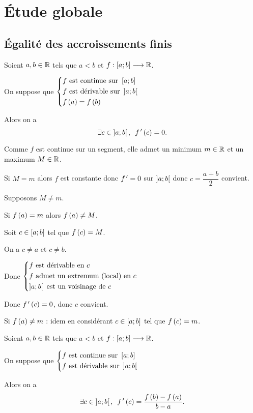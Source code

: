 \section{Étude globale}

\subsection{Égalité des accroissements finis}

\begin{theo}
Soient \(a,b\in\mathbb{R}\) tels que \(a<b\) et \(f:\left[a;b\right]\longrightarrow\mathbb{R}\).

On suppose que \(\begin{dcases}f\text{ est continue sur }\left[a;b\right] \\ f\text{ est dérivable sur }\left]a;b\right[ \\ f\left(a\right)=f\left(b\right)\end{dcases}\)

Alors on a \[\quantifs{\exists c\in\intervee{a}{b}}f\prim\paren{c}=0.\]
\end{theo}

\begin{dem}
Comme \(f\) est continue sur un segment, elle admet un minimum \(m\in\mathbb{R}\) et un maximum \(M\in\mathbb{R}\).

Si \(M=m\) alors \(f\) est constante donc \(f^{\,\prime}=0\) sur \(\left]a;b\right[\) donc \(c=\dfrac{a+b}{2}\) convient.

Supposons \(M\not=m\).

Si \(f\left(a\right)=m\) alors \(f\left(a\right)\not=M\).

Soit \(c\in\left[a;b\right]\) tel que \(f\left(c\right)=M\).

On a \(c\not=a\) et \(c\not=b\).

Donc \(\begin{dcases}f\text{ est dérivable en }c \\ f\text{ admet un extremum (local) en }c \\ \left]a;b\right[\text{ est un voisinage de }c\end{dcases}\)

Donc \(f^{\,\prime}\left(c\right)=0\), donc \(c\) convient.

Si \(f\left(a\right)\not=m\) : idem en considérant \(c\in\left[a;b\right]\) tel que \(f\left(c\right)=m\).
\end{dem}

\begin{cor}
Soient \(a,b\in\mathbb{R}\) tels que \(a<b\) et \(f:\left[a;b\right]\longrightarrow\mathbb{R}\).

On suppose que \(\begin{dcases}f\text{ est continue sur }\left[a;b\right] \\ f\text{ est dérivable sur }\left]a;b\right[\end{dcases}\)

Alors on a \[\quantifs{\exists c\in\intervee{a}{b}}f\prim\paren{c}=\dfrac{f\paren{b}-f\paren{a}}{b-a}.\]
\end{cor}

